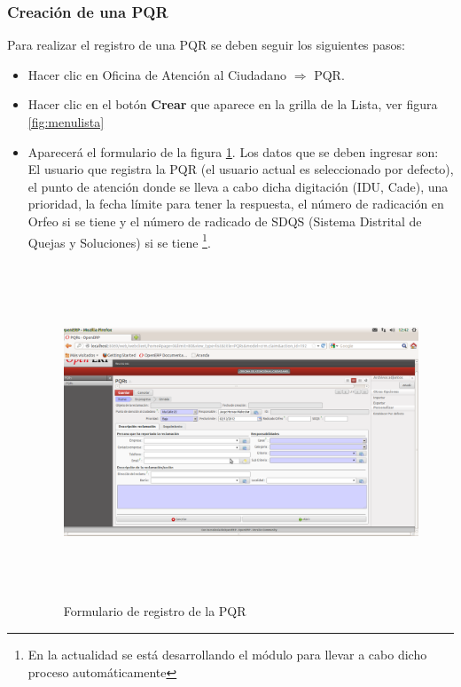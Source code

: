 \subsubsection{Creación de una PQR}

Para realizar el registro de una PQR se deben seguir los siguientes pasos:

\begin{itemize}
 \item Hacer clic en Oficina de Atención al Ciudadano $\Rightarrow$ PQR. 
 \item Hacer clic en el botón \textbf{Crear} que aparece en la grilla de la Lista, ver figura \ref{fig:menulista} 
 \item Aparecerá el formulario de la figura \ref{fig:formularioregistro}. Los datos que se deben ingresar son: El usuario que registra 
 la PQR (el usuario actual es seleccionado por defecto), el punto de atención donde se lleva a cabo dicha digitación (IDU, Cade), una prioridad, la fecha límite para tener la respuesta, el número
 de radicación en Orfeo si se tiene y el número de radicado de SDQS (Sistema Distrital de Quejas y Soluciones) si se tiene \footnote{En la actualidad 
 se está desarrollando el módulo para llevar a cabo dicho proceso automáticamente}. 
 \begin{figure}[H]
 \centering
 \includegraphics[width=17cm,height=10cm]{./Imagenes/formularioregistro.png}
 \caption{Formulario de registro de la PQR}
 \label{fig:formularioregistro}
\end{figure}


\end{itemize}
